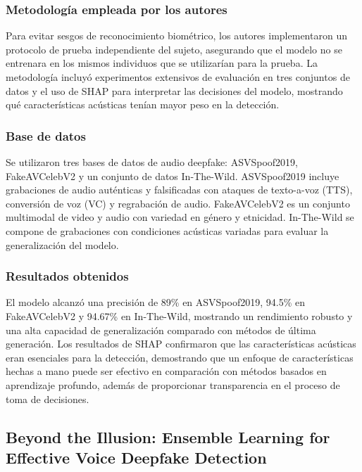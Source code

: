 \subsubsection{Metodología empleada por los autores}
Para evitar sesgos de reconocimiento biométrico, los autores implementaron un protocolo de prueba independiente del sujeto, asegurando que el modelo no se entrenara en los mismos individuos que se utilizarían para la prueba. La metodología incluyó experimentos extensivos de evaluación en tres conjuntos de datos y el uso de SHAP para interpretar las decisiones del modelo, mostrando qué características acústicas tenían mayor peso en la detección.

\subsubsection{Base de datos}
Se utilizaron tres bases de datos de audio deepfake: ASVSpoof2019, FakeAVCelebV2 y un conjunto de datos In-The-Wild. ASVSpoof2019 incluye grabaciones de audio auténticas y falsificadas con ataques de texto-a-voz (TTS), conversión de voz (VC) y regrabación de audio. FakeAVCelebV2 es un conjunto multimodal de video y audio con variedad en género y etnicidad. In-The-Wild se compone de grabaciones con condiciones acústicas variadas para evaluar la generalización del modelo.

\subsubsection{Resultados obtenidos}
El modelo alcanzó una precisión de 89\% en ASVSpoof2019, 94.5\% en FakeAVCelebV2 y 94.67\% en In-The-Wild, mostrando un rendimiento robusto y una alta capacidad de generalización comparado con métodos de última generación. Los resultados de SHAP confirmaron que las características acústicas eran esenciales para la detección, demostrando que un enfoque de características hechas a mano puede ser efectivo en comparación con métodos basados en aprendizaje profundo, además de proporcionar transparencia en el proceso de toma de decisiones.

\subsection{Beyond the Illusion: Ensemble Learning for Effective Voice Deepfake Detection \citep*{oh2023}}

